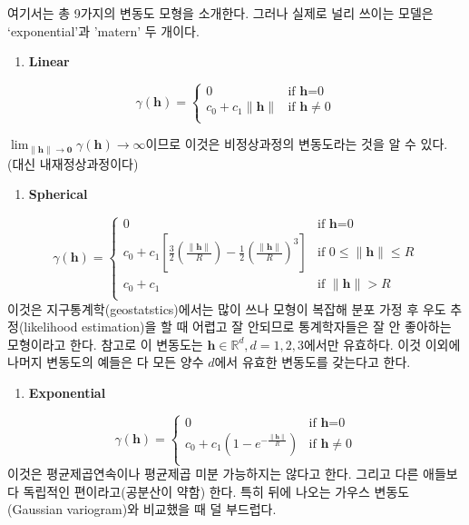 \documentclass[b5paper,]{scrbook}
\providecommand{\tightlist}{%
  \setlength{\itemsep}{0pt}\setlength{\parskip}{0pt}}
\theoremstyle{plain}
\theoremstyle{definition}
\numberwithin{equation}{section}
\begin{document}
여기서는 총 9가지의 변동도 모형을 소개한다. 그러나 실제로 널리 쓰이는
모델은 `exponential'과 'matern' 두 개이다.

\begin{enumerate}
\def\labelenumi{\arabic{enumi}.}
\tightlist
\item
  \textbf{Linear}
\end{enumerate}

\[
\gamma(\mathbf{h})= \left\{ \begin{array}{ll}
0 & \textrm{if $\mathbf{h}$=0}\\
c_{0}+c_{1}\| \mathbf{h}\| & \textrm{if $\mathbf{h}\neq 0$}\\
\end{array} \right.
\]

\(\lim_{\|\mathbf{h}\| \rightarrow \mathbf{0}}\gamma(\mathbf{h}) \rightarrow \infty\)이므로
이것은 비정상과정의 변동도라는 것을 알 수 있다. (대신 내재정상과정이다)

\begin{enumerate}
\def\labelenumi{\arabic{enumi}.}
\setcounter{enumi}{1}
\tightlist
\item
  \textbf{Spherical}
\end{enumerate}

\[
\gamma(\mathbf{h})= \left\{ \begin{array}{ll}
0 & \textrm{if $\mathbf{h}$=0}\\
c_{0}+c_{1}[\frac{3}{2}(\frac{\| \mathbf{h}\|}{R})-\frac{1}{2}(\frac{\| \mathbf{h}\|}{R})^{3}] & \textrm{if $0 \leq \|\mathbf{h}\|\leq R$}\\
c_{0}+c_{1} & \textrm{if $\|\mathbf{h}\|>R$}\\
\end{array} \right.
\] 이것은 지구통계학(geostatstics)에서는 많이 쓰나 모형이 복잡해 분포
가정 후 우도 추정(likelihood estimation)을 할 때 어렵고 잘 안되므로
통계학자들은 잘 안 좋아하는 모형이라고 한다. 참고로 이 변동도는
\(\mathbf{h} \in \mathbb{R}^{d}, d=1,2,3\)에서만 유효하다. 이것 이외에
나머지 변동도의 예들은 다 모든 양수 \(d\)에서 유효한 변동도를 갖는다고
한다.

\begin{enumerate}
\def\labelenumi{\arabic{enumi}.}
\setcounter{enumi}{2}
\tightlist
\item
  \textbf{Exponential}
\end{enumerate}

\[
\gamma(\mathbf{h})= \left\{ \begin{array}{ll}
0 & \textrm{if $\mathbf{h}$=0}\\
c_{0}+c_{1}(1-e^{-\frac{\|\mathbf{h}\|}{R}}) & \textrm{if $\mathbf{h}\neq 0$}\\
\end{array} \right.
\] 이것은 평균제곱연속이나 평균제곱 미분 가능하지는 않다고 한다. 그리고
다른 애들보다 독립적인 편이라고(공분산이 약함) 한다. 특히 뒤에 나오는
가우스 변동도(Gaussian variogram)와 비교했을 때 덜 부드럽다.
\end{document}
